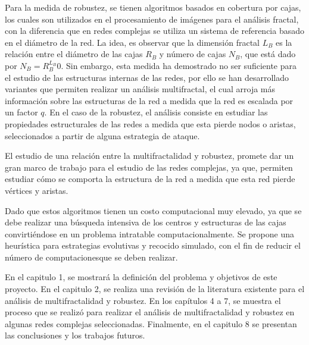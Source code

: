 Para la medida de robustez, se tienen algoritmos basados en cobertura por cajas\cite{Song2007}, los cuales son utilizados en el procesamiento de imágenes para el análisis fractal, con la diferencia que en redes complejas se utiliza un sistema de referencia basado en el diámetro de la red. La idea, es observar que la dimensión fractal $L_B$ es la relación entre el diámetro de las cajas $R_B$ y número de cajas $N_B$, que está dado por $N_B=R_{B}^{L_B}0$. Sin embargo, esta medida ha demostrado no ser suficiente para el estudio de las estructuras internas de las redes\cite{Wang2012}, por ello se han desarrollado variantes que permiten realizar un análisis multifractal, el cual arroja más información sobre las estructuras de la red a medida que la red es escalada por un factor $q$. En el caso de la robustez, el análisis consiste en estudiar las propiedades estructurales de las redes a medida que esta pierde nodos o aristas, seleccionados a partir de alguna estrategia de ataque.

El estudio de una relación entre la multifractalidad y robustez, promete dar un gran marco de trabajo para el estudio de las redes complejas, ya que, permiten estudiar cómo se comporta la estructura de la red a medida que esta red pierde vértices y aristas.

Dado que estos algoritmos tienen un costo computacional muy elevado, ya que se debe realizar una búsqueda intensiva de los centros y estructuras de las cajas convirtiéndose en un problema intratable computacionalmente. Se propone una heurística para estrategias evolutivas y recocido simulado, con el fin de reducir el número de computacionesque se deben realizar.

En el capitulo 1, se mostrará la definición del problema y objetivos de este proyecto. En el capitulo 2, se realiza una revisión de la literatura existente para el análisis de multifractalidad y robustez. En los capítulos 4 a 7, se muestra el proceso que se realizó para realizar el análisis de multifractalidad y robustez en algunas redes complejas seleccionadas. Finalmente, en el capitulo 8 se presentan las conclusiones y los trabajos futuros.